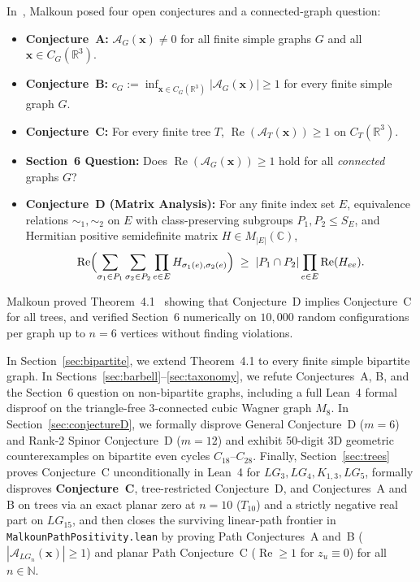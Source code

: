 \documentclass[11pt]{amsart}
\renewcommand{\_}{\origunderscore\penalty0\relax}
\theoremstyle{plain}
\theoremstyle{definition}
\theoremstyle{remark}
\newcommand{\C}{\mathbb{C}}
\newcommand{\R}{\mathbb{R}}
\newcommand{\AG}{\mathcal{A}_G}
\DeclareMathOperator{\RePart}{Re}
\begin{document}
In~\cite{Malkoun2026}, Malkoun posed four open conjectures and a connected-graph question:
\begin{itemize}
    \item \textbf{Conjecture~A:} $\AG(\mathbf{x}) \neq 0$ for all finite simple graphs $G$ and all $\mathbf{x} \in C_G(\R^3)$.
    \item \textbf{Conjecture~B:} $c_G := \inf_{\mathbf{x} \in C_G(\R^3)} |\AG(\mathbf{x})| \ge 1$ for every finite simple graph $G$.
    \item \textbf{Conjecture~C:} For every finite tree $T$, $\RePart(\mathcal{A}_T(\mathbf{x})) \ge 1$ on $C_T(\R^3)$.
    \item \textbf{Section~6 Question:} Does $\RePart(\AG(\mathbf{x})) \ge 1$ hold for all \emph{connected} graphs $G$?
    \item \textbf{Conjecture~D (Matrix Analysis):} For any finite index set $E$, equivalence relations $\sim_1, \sim_2$ on $E$ with class-preserving subgroups $P_1, P_2 \le S_E$, and Hermitian positive semidefinite matrix $H \in M_{|E|}(\C)$,
    \begin{equation}\label{eq:conjD}
        \RePart\Bigl(\sum_{\sigma_1 \in P_1}\sum_{\sigma_2 \in P_2} \prod_{e \in E} H_{\sigma_1(e),\sigma_2(e)}\Bigr)
        \;\ge\; |P_1 \cap P_2| \prod_{e \in E} \RePart(H_{ee}).
    \end{equation}
\end{itemize}
Malkoun proved Theorem~4.1~\cite{Malkoun2026} showing that Conjecture~D implies Conjecture~C for all trees, and verified Section~6 numerically on $10{,}000$ random configurations per graph up to $n = 6$ vertices without finding violations.

In Section~\ref{sec:bipartite}, we extend Theorem~4.1 to every finite simple bipartite graph. In Sections~\ref{sec:barbell}--\ref{sec:taxonomy}, we refute Conjectures~A, B, and the Section~6 question on non-bipartite graphs, including a full Lean~4 formal disproof on the triangle-free 3-connected cubic Wagner graph $M_8$. In Section~\ref{sec:conjectureD}, we formally disprove General Conjecture~D ($m=6$) and Rank-2 Spinor Conjecture~D ($m=12$) and exhibit 50-digit 3D geometric counterexamples on bipartite even cycles $C_{18}$--$C_{28}$. Finally, Section~\ref{sec:trees} proves Conjecture~C unconditionally in Lean~4 for $LG_3, LG_4, K_{1,3}, LG_5$, formally disproves \textbf{Conjecture~C}, tree-restricted Conjecture~D, and Conjectures~A and B on trees via an exact planar zero at $n = 10$ ($T_{10}$) and a strictly negative real part on $LG_{15}$, and then closes the surviving linear-path frontier in \texttt{MalkounPathPositivity.lean} by proving Path Conjectures~A and~B ($|\mathcal{A}_{LG_n}(\mathbf{x})| \ge 1$) and planar Path Conjecture~C ($\RePart \ge 1$ for $z_u \equiv 0$) for all $n \in \mathbb{N}$.
\end{document}
